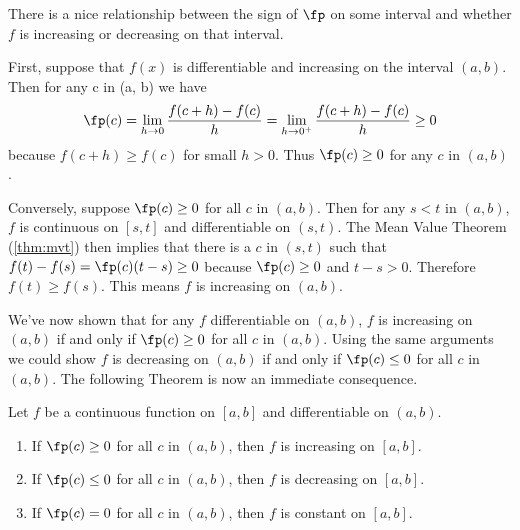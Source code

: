 There is a nice relationship between the sign of $\fp$ on some interval and whether $f$ is increasing or decreasing on that interval.

First, suppose that $f(x)$ is differentiable and increasing on the interval $(a,b)$. Then for any c in (a, b) we have
\[\fp(c)=\lim_{h\to0}\frac{f(c+h)-f(c)}h=\lim_{h\to0^+}\frac{f(c+h)-f(c)}h\ge0\]
because $f(c+h)\ge f(c)$ for small $h>0$. Thus $\fp(c)\ge0$ for any $c$ in $(a,b)$.

Conversely, suppose $\fp(c)\ge0$ for all $c$ in $(a,b)$. Then for any $s<t$ in $(a,b)$, $f$ is continuous on $[s,t]$ and differentiable on $(s,t)$. The Mean Value Theorem (\autoref{thm:mvt}) then implies that there is a $c$ in $(s,t)$ such that
$f(t)-f(s)=\fp(c)(t-s)\ge0$
because $\fp(c)\ge0$ and $t-s>0$. Therefore $f(t)\ge f(s)$. This means $f$ is increasing on $(a,b)$.

We've now shown that for any $f$ differentiable on $(a,b)$,
$f$ is increasing on $(a,b)$ if and only if $\fp(c)\ge0$ for all $c$ in $(a,b)$.
Using the same arguments we could show $f$ is decreasing on $(a,b)$ if and only if $\fp(c)\le0$ for all $c$ in $(a,b)$. The following Theorem is now an immediate consequence.


%
{Let $f$ be a continuous function on $[a,b]$ and differentiable on $(a,b)$.
\begin{enumerate}
\item	If $\fp(c) \ge 0$ for all $c$ in $(a,b)$, then $f$ is increasing on $[a,b]$.
\item	If $\fp(c) \le 0$ for all $c$ in $(a,b)$, then $f$ is decreasing on $[a,b]$.
\item	If $\fp(c) =0$ for all $c$ in $(a,b)$, then $f$ is constant on $[a,b]$.
\end{enumerate}}


